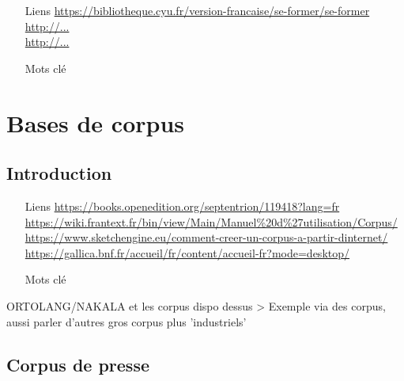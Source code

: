 \documentclass{book}
\begin{document}
\begin{itemize}
    \item [Liens]
        \url{https://bibliotheque.cyu.fr/version-francaise/se-former/se-former}\\
        \url{http://...}\\
        \url{http://...}\\
    \item [Mots clé]
\end{itemize}


\section{Bases de corpus}

\subsection*{Introduction}


\begin{itemize}
    \item [Liens]
        \url{https://books.openedition.org/septentrion/119418?lang=fr}\\
        \url{https://wiki.frantext.fr/bin/view/Main/Manuel%20d%27utilisation/Corpus/}\\
        \url{https://www.sketchengine.eu/comment-creer-un-corpus-a-partir-dinternet/}\\
        \url{https://gallica.bnf.fr/accueil/fr/content/accueil-fr?mode=desktop/}\\
    \item [Mots clé]
\end{itemize}

ORTOLANG/NAKALA et les corpus dispo dessus > Exemple via des corpus, aussi parler d'autres gros corpus plus 'industriels'


\subsection{Corpus de presse}%
\end{document}
